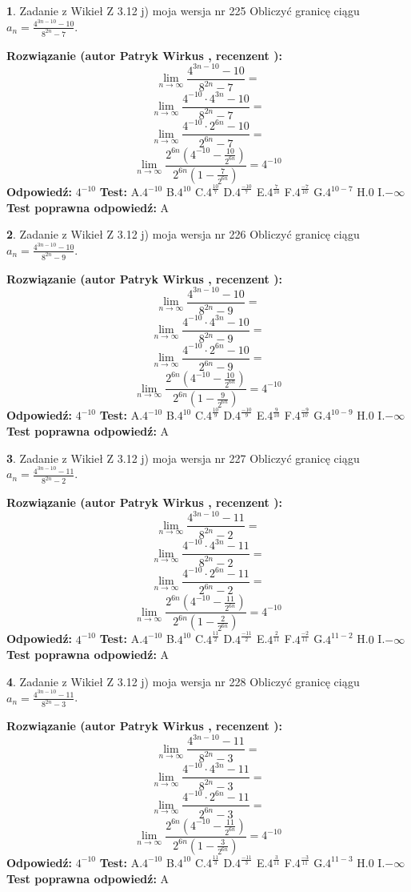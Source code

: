 \documentclass[12pt, a4paper]{article}
\theoremstyle{definition} %
\newtheorem{zad}{}
\newcommand{\zadStart}[1]{\begin{zad}#1\newline}
\newcommand{\zadStop}{\end{zad}}
\newcommand{\rozwStart}[2]{\noindent \textbf{Rozwiązanie (autor #1 , recenzent #2): }\newline}
\newcommand{\rozwStop}{\newline}
\newcommand{\odpStart}{\noindent \textbf{Odpowiedź:}\newline}
\newcommand{\odpStop}{\newline}
\newcommand{\testStart}{\noindent \textbf{Test:}\newline}
\newcommand{\testStop}{\newline}
\newcommand{\kluczStart}{\noindent \textbf{Test poprawna odpowiedź:}\newline}
\newcommand{\kluczStop}{\newline}
\begin{document}
\zadStart{Zadanie z Wikieł Z 3.12 j) moja wersja nr 225}
Obliczyć granicę ciągu $a_{n}=\frac{4^{3n-10}-10}{8^{2n}-7}$.
\zadStop
\rozwStart{Patryk Wirkus}{}
$$\lim\limits_{n\to\infty}\frac{4^{3n-10}-10}{8^{2n}-7}=$$
$$\lim\limits_{n\to\infty}\frac{4^{-10} \cdot 4^{3n}-10}{8^{2n}-7}=$$
$$\lim\limits_{n\to\infty}\frac{4^{-10} \cdot 2^{6n}-10}{2^{6n}-7}=$$
$$\lim\limits_{n\to\infty}\frac{2^{6n}(4^{-10} - \frac{10}{2^{6n}})}{2^{6n}(1-\frac{7}{2^{6n}})}= 4^{-10}$$
\rozwStop
\odpStart
$4^{-10}$
\odpStop
\testStart
A.$4^{-10}$
B.$4^{10}$
C.$4^{\frac{10}{7}}$
D.$4^{\frac{-10}{7}}$
E.$4^{\frac{7}{10}}$
F.$4^{\frac{-7}{10}}$
G.$4^{10-7}$
H.$0$
I.$-\infty$
\testStop
\kluczStart
A
\kluczStop



\zadStart{Zadanie z Wikieł Z 3.12 j) moja wersja nr 226}
Obliczyć granicę ciągu $a_{n}=\frac{4^{3n-10}-10}{8^{2n}-9}$.
\zadStop
\rozwStart{Patryk Wirkus}{}
$$\lim\limits_{n\to\infty}\frac{4^{3n-10}-10}{8^{2n}-9}=$$
$$\lim\limits_{n\to\infty}\frac{4^{-10} \cdot 4^{3n}-10}{8^{2n}-9}=$$
$$\lim\limits_{n\to\infty}\frac{4^{-10} \cdot 2^{6n}-10}{2^{6n}-9}=$$
$$\lim\limits_{n\to\infty}\frac{2^{6n}(4^{-10} - \frac{10}{2^{6n}})}{2^{6n}(1-\frac{9}{2^{6n}})}= 4^{-10}$$
\rozwStop
\odpStart
$4^{-10}$
\odpStop
\testStart
A.$4^{-10}$
B.$4^{10}$
C.$4^{\frac{10}{9}}$
D.$4^{\frac{-10}{9}}$
E.$4^{\frac{9}{10}}$
F.$4^{\frac{-9}{10}}$
G.$4^{10-9}$
H.$0$
I.$-\infty$
\testStop
\kluczStart
A
\kluczStop



\zadStart{Zadanie z Wikieł Z 3.12 j) moja wersja nr 227}
Obliczyć granicę ciągu $a_{n}=\frac{4^{3n-10}-11}{8^{2n}-2}$.
\zadStop
\rozwStart{Patryk Wirkus}{}
$$\lim\limits_{n\to\infty}\frac{4^{3n-10}-11}{8^{2n}-2}=$$
$$\lim\limits_{n\to\infty}\frac{4^{-10} \cdot 4^{3n}-11}{8^{2n}-2}=$$
$$\lim\limits_{n\to\infty}\frac{4^{-10} \cdot 2^{6n}-11}{2^{6n}-2}=$$
$$\lim\limits_{n\to\infty}\frac{2^{6n}(4^{-10} - \frac{11}{2^{6n}})}{2^{6n}(1-\frac{2}{2^{6n}})}= 4^{-10}$$
\rozwStop
\odpStart
$4^{-10}$
\odpStop
\testStart
A.$4^{-10}$
B.$4^{10}$
C.$4^{\frac{11}{2}}$
D.$4^{\frac{-11}{2}}$
E.$4^{\frac{2}{11}}$
F.$4^{\frac{-2}{11}}$
G.$4^{11-2}$
H.$0$
I.$-\infty$
\testStop
\kluczStart
A
\kluczStop



\zadStart{Zadanie z Wikieł Z 3.12 j) moja wersja nr 228}
Obliczyć granicę ciągu $a_{n}=\frac{4^{3n-10}-11}{8^{2n}-3}$.
\zadStop
\rozwStart{Patryk Wirkus}{}
$$\lim\limits_{n\to\infty}\frac{4^{3n-10}-11}{8^{2n}-3}=$$
$$\lim\limits_{n\to\infty}\frac{4^{-10} \cdot 4^{3n}-11}{8^{2n}-3}=$$
$$\lim\limits_{n\to\infty}\frac{4^{-10} \cdot 2^{6n}-11}{2^{6n}-3}=$$
$$\lim\limits_{n\to\infty}\frac{2^{6n}(4^{-10} - \frac{11}{2^{6n}})}{2^{6n}(1-\frac{3}{2^{6n}})}= 4^{-10}$$
\rozwStop
\odpStart
$4^{-10}$
\odpStop
\testStart
A.$4^{-10}$
B.$4^{10}$
C.$4^{\frac{11}{3}}$
D.$4^{\frac{-11}{3}}$
E.$4^{\frac{3}{11}}$
F.$4^{\frac{-3}{11}}$
G.$4^{11-3}$
H.$0$
I.$-\infty$
\testStop
\kluczStart
A
\kluczStop
\end{document}
